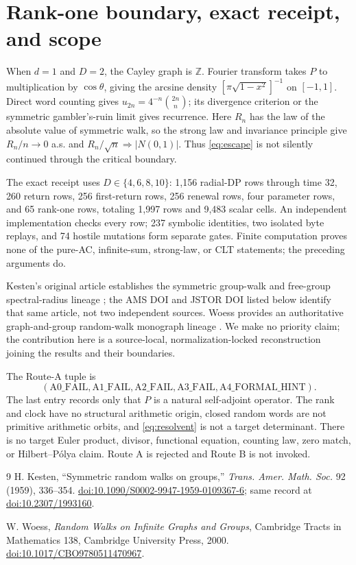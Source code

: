 \documentclass[10pt]{article}
\theoremstyle{remark}
\newcommand{\1}{\mathsf{1}}
\begin{document}
\section{Rank-one boundary, exact receipt, and scope}

When $d=1$ and $D=2$, the Cayley graph is $\mathbb Z$.  Fourier transform
takes $P$ to multiplication by $\cos\theta$, giving the arcsine density
$[\pi\sqrt{1-x^2}]^{-1}$ on $[-1,1]$.  Direct word counting gives
$u_{2n}=4^{-n}\binom{2n}{n}$; its divergence criterion or the symmetric
gambler's-ruin limit gives recurrence.  Here $R_n$ has the law of the
absolute value of symmetric walk, so the strong law and invariance principle
give $R_n/n\to0$ a.s. and $R_n/\sqrt n\Rightarrow|N(0,1)|$.  Thus
\eqref{eq:escape} is not
silently continued through the critical boundary.

The exact receipt uses $D\in\{4,6,8,10\}$: 1,156 radial-DP rows through time
32, 260 return rows, 256 first-return rows, 256 renewal rows, four parameter
rows, and 65 rank-one rows, totaling 1,997 rows and 9,483 scalar cells.
An independent implementation checks every row; 237 symbolic identities,
two isolated byte replays, and 74 hostile mutations form separate gates.
Finite computation proves none of the pure-AC, infinite-sum, strong-law, or
CLT statements; the preceding arguments do.

Kesten's original article establishes the symmetric group-walk and free-group
spectral-radius lineage \cite{kesten}; the AMS DOI and JSTOR DOI listed below
identify that same article, not two independent sources.  Woess provides an
authoritative graph-and-group random-walk monograph lineage \cite{woess}.
We make no priority claim; the contribution here is a source-local,
normalization-locked reconstruction joining the results and their boundaries.

The Route-A tuple is
\[
 (\mathrm{A0\_FAIL},\mathrm{A1\_FAIL},\mathrm{A2\_FAIL},
  \mathrm{A3\_FAIL},\mathrm{A4\_FORMAL\_HINT}).
\]
The last entry records only that $P$ is a natural self-adjoint operator.
The rank and clock have no structural arithmetic origin, closed random words
are not primitive arithmetic orbits, and \eqref{eq:resolvent} is not a target determinant.
There is no target Euler product, divisor, functional equation, counting law,
zero match, or Hilbert--P\'olya claim.  Route A is rejected and Route B is
not invoked.
\fi

\begin{thebibliography}{9}
H. Kesten,
``Symmetric random walks on groups,''
\emph{Trans. Amer. Math. Soc.} 92 (1959), 336--354.
\href{https://doi.org/10.1090/S0002-9947-1959-0109367-6}{doi:10.1090/S0002-9947-1959-0109367-6};
same record at \href{https://doi.org/10.2307/1993160}{doi:10.2307/1993160}.

W. Woess,
\emph{Random Walks on Infinite Graphs and Groups},
Cambridge Tracts in Mathematics 138, Cambridge University Press, 2000.
\href{https://doi.org/10.1017/CBO9780511470967}{doi:10.1017/CBO9780511470967}.
\end{thebibliography}
\end{document}
